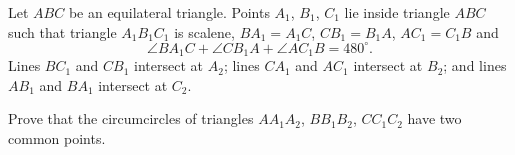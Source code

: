 Let $ABC$ be an equilateral triangle. Points $A_1$, $B_1$, $C_1$ lie inside triangle $ABC$ such that triangle $A_1B_1C_1$ is scalene, $BA_1 = A_1C$, $CB_1 = B_1A$, $AC_1 = C_1B$ and
\[
\angle BA_1C + \angle CB_1A + \angle AC_1B = 480^\circ.
\]
Lines $BC_1$ and $CB_1$ intersect at $A_2$; lines $CA_1$ and $AC_1$ intersect at $B_2$; and lines $AB_1$ and $BA_1$ intersect at $C_2$.

Prove that the circumcircles of triangles $AA_1A_2$, $BB_1B_2$, $CC_1C_2$ have two common points.
